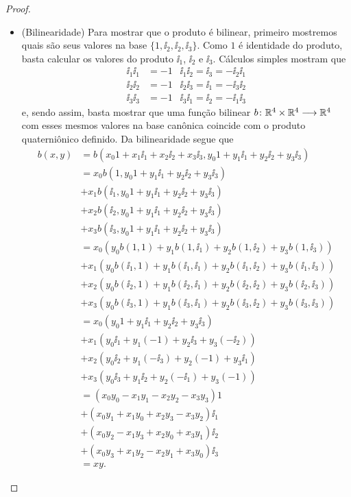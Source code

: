 \begin{proof}
\begin{itemize}
	\item (Bilinearidade) Para mostrar que o produto é bilinear, primeiro mostremos quais são seus valores na base $\{1,\ii_2,\ii_2,\ii_3\}$. Como $1$ é identidade do produto, basta calcular os valores do produto $\ii_1$, $\ii_2$ e $\ii_3$. Cálculos simples mostram que
		\begin{align*}
		\ii_1 \ii_1 &= -1 &\ii_1 \ii_2 = \ii_3 = -\ii_2 \ii_1 \\
		\ii_2 \ii_2 &= -1 &\ii_2 \ii_3 = \ii_1 = -\ii_3 \ii_2 \\
		\ii_3 \ii_3 &= -1 &\ii_3 \ii_1 = \ii_2 = -\ii_1 \ii_3
		\end{align*}
	e, sendo assim, basta mostrar que uma função bilinear ${b}\colon {\mathbb{R}^4 \times \mathbb{R}^4} \longrightarrow {\mathbb{R}^4}$ com esses mesmos valores na base canônica coincide com o produto quaterniônico definido. Da bilinearidade segue que
		\begin{align*}
		b(x,y) &= b(x_0 1 + x_1 \ii_1 + x_2 \ii_2 + x_3 \ii_3, y_0 1 + y_1 \ii_1 + y_2 \ii_2 + y_3 \ii_3) \\
			&= x_0 b(1, y_0 1 + y_1 \ii_1 + y_2 \ii_2 + y_3 \ii_3) \\
			&+ x_1 b(\ii_1, y_0 1 + y_1 \ii_1 + y_2 \ii_2 + y_3 \ii_3) \\
			&+ x_2 b(\ii_2, y_0 1 + y_1 \ii_1 + y_2 \ii_2 + y_3 \ii_3) \\
			&+ x_3 b(\ii_3, y_0 1 + y_1 \ii_1 + y_2 \ii_2 + y_3 \ii_3) \\
			&= x_0 (y_0 b(1,1) + y_1 b(1,\ii_1) + y_2 b(1,\ii_2) + y_3 b(1,\ii_3)) \\
			&+ x_1 (y_0 b(\ii_1,1) + y_1 b(\ii_1,\ii_1) + y_2 b(\ii_1,\ii_2) + y_3 b(\ii_1,\ii_3)) \\
			&+ x_2 (y_0 b(\ii_2,1) + y_1 b(\ii_2,\ii_1) + y_2 b(\ii_2,\ii_2) + y_3 b(\ii_2,\ii_3)) \\
			&+ x_3 (y_0 b(\ii_3,1) + y_1 b(\ii_3,\ii_1) + y_2 b(\ii_3,\ii_2) + y_3 b(\ii_3,\ii_3)) \\
			&= x_0 (y_0 1 + y_1 \ii_1 + y_2 \ii_2 + y_3 \ii_3) \\
			&+ x_1 (y_0 \ii_1 + y_1 (-1) + y_2 \ii_3 + y_3 (-\ii_2)) \\
			&+ x_2 (y_0 \ii_2 + y_1 (-\ii_3) + y_2 (-1) + y_3 \ii_1) \\
			&+ x_3 (y_0 \ii_3 + y_1 \ii_2 + y_2 (-\ii_1) + y_3 (-1)) \\
			&= (x_0y_0 - x_1y_1 - x_2y_2 - x_3y_3) 1 \\
			&+ (x_0y_1 + x_1y_0 + x_2y_3 - x_3y_2) \ii_1 \\
			&+ (x_0y_2 - x_1y_3 + x_2y_0 + x_3y_1) \ii_2 \\
			&+ (x_0y_3 + x_1y_2 - x_2y_1 + x_3y_0) \ii_3 \\
			&= xy.
		\end{align*}


\end{itemize}
\end{proof}
